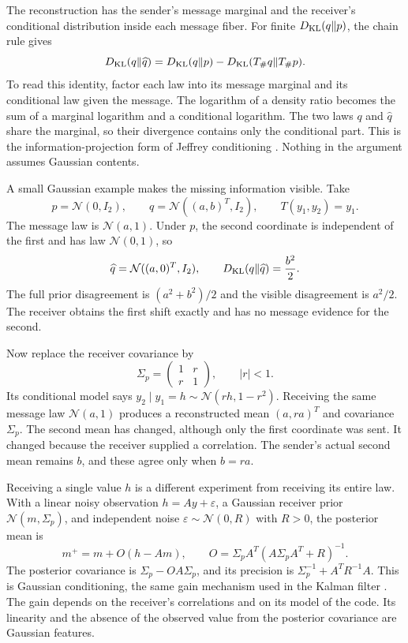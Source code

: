 The reconstruction has the sender's message marginal and the receiver's conditional distribution inside each message fiber. For finite $D_{\mathrm{KL}}(q\Vert p)$, the chain rule gives
\begin{equation}
D_{\mathrm{KL}}(q\Vert\widehat q)
=D_{\mathrm{KL}}(q\Vert p)-D_{\mathrm{KL}}(T_\#q\Vert T_\#p).
\label{c17:loss}
\end{equation}
To read this identity, factor each law into its message marginal and its conditional law given the message. The logarithm of a density ratio becomes the sum of a marginal logarithm and a conditional logarithm. The two laws $q$ and $\widehat q$ share the marginal, so their divergence contains only the conditional part. This is the information-projection form of Jeffrey conditioning \citep{DiaconisZabell1982,Csiszar1975}. Nothing in the argument assumes Gaussian contents.

A small Gaussian example makes the missing information visible. Take
\begin{equation}
p=\mathcal N(0,I_2),\qquad
q=\mathcal N((a,b)^T,I_2),\qquad
T(y_1,y_2)=y_1.
\end{equation}
The message law is $\mathcal N(a,1)$. Under $p$, the second coordinate is independent of the first and has law $\mathcal N(0,1)$, so
\begin{equation}
\widehat q=\mathcal N((a,0)^T,I_2),\qquad
D_{\mathrm{KL}}(q\Vert\widehat q)=\frac{b^2}{2}.
\label{c17:loss-example}
\end{equation}
The full prior disagreement is $(a^2+b^2)/2$ and the visible disagreement is $a^2/2$. The receiver obtains the first shift exactly and has no message evidence for the second.

Now replace the receiver covariance by
\begin{equation}
\Sigma_p=\begin{pmatrix}1&r\\r&1\end{pmatrix},
\qquad |r|<1.
\end{equation}
Its conditional model says $y_2\mid y_1=h\sim\mathcal N(rh,1-r^2)$. Receiving the same message law $\mathcal N(a,1)$ produces a reconstructed mean $(a,ra)^T$ and covariance $\Sigma_p$. The second mean has changed, although only the first coordinate was sent. It changed because the receiver supplied a correlation. The sender's actual second mean remains $b$, and these agree only when $b=ra$.

Receiving a single value $h$ is a different experiment from receiving its entire law. With a linear noisy observation $h=Ay+\varepsilon$, a Gaussian receiver prior $\mathcal N(m,\Sigma_p)$, and independent noise $\varepsilon\sim\mathcal N(0,R)$ with $R>0$, the posterior mean is
\begin{equation}
m^+=m+O(h-Am),\qquad
O=\Sigma_pA^T(A\Sigma_pA^T+R)^{-1}.
\label{c17:gain}
\end{equation}
The posterior covariance is $\Sigma_p-OA\Sigma_p$, and its precision is $\Sigma_p^{-1}+A^TR^{-1}A$. This is Gaussian conditioning, the same gain mechanism used in the Kalman filter \citep{Kalman1960}. The gain depends on the receiver's correlations and on its model of the code. Its linearity and the absence of the observed value from the posterior covariance are Gaussian features.

